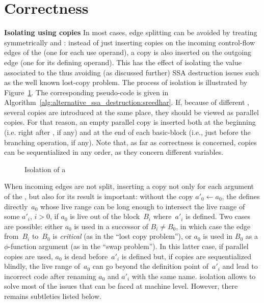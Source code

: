 \section{Correctness}

{\bf Isolating \phinode using copies}
In most cases, edge splitting can be avoided by treating symmetrically \phiuses and \phidef: instead of just inserting copies on the incoming control-flow edges of the \phinode (one for each use operand), a copy is also inserted on the outgoing edge (one for its defining operand). This has the effect of isolating the value associated to the \phinode thus avoiding (as discussed further) SSA destruction issues such as the well known lost-copy problem.
The process of \phinode isolation is illustrated by Figure~\ref{fig:phi_isolation}.
The corresponding pseudo-code is given in Algorithm~\ref{alg:alternative_ssa_destruction:sreedhar}. If, because of different \phifuns, several copies are introduced at the
same place, they should be viewed as parallel copies. For that reason, an empty parallel copy is inserted both at the beginning (i.e. right after \phifuns, if any) and at the end of each basic-block (i.e., just before the branching operation, if any).  
Note that, as far as correctness is concerned, copies
can be sequentialized in any order, as they concern different
variables. 

\begin{figure}[h]
\hfill
{}
\caption{Isolation of a \phinode\label{fig:phi_isolation}}
\end{figure}


When incoming edges are not split, inserting a copy not only for each argument of the \phifun, but also for its result is important: without the copy $a'_0\gets a_0$, the \phifun defines
directly~$a_0$ whose live range can be long enough to intersect the live range
of some $a'_i$, $i>0$, if $a_0$ is live out of the block~$B_i$ where~$a'_i$ is
defined. Two cases are possible: either $a_0$ is used in a successor of $B_i
\neq B_0$, in which case the edge from~$B_i$ to~$B_0$ is \emph{critical} (as in
the ``lost copy problem''), or $a_0$ is used in $B_0$ as a $\phi$-function
argument (as in the ``swap problem''). In this latter case, if parallel copies
are used, $a_0$ is dead before~$a'_i$ is defined but, if copies are
sequentialized blindly, the live range of~$a_0$ can go beyond the definition
point of~$a'_i$ and lead to incorrect code after renaming $a_0$ and $a'_i$ with
the same name. \phinode isolation allows to solve most of the issues that can be faced at machine level. However, there remains subtleties listed below.



